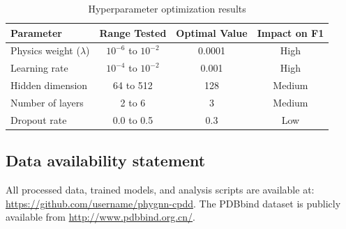 \begin{table}[H]
\centering
\caption{Hyperparameter optimization results}
\begin{tabular}{lccc}
\toprule
\textbf{Parameter} & \textbf{Range Tested} & \textbf{Optimal Value} & \textbf{Impact on F1} \\
\midrule
Physics weight ($\lambda$) & $10^{-6}$ to $10^{-2}$ & 0.0001 & High \\
Learning rate & $10^{-4}$ to $10^{-2}$ & 0.001 & High \\
Hidden dimension & 64 to 512 & 128 & Medium \\
Number of layers & 2 to 6 & 3 & Medium \\
Dropout rate & 0.0 to 0.5 & 0.3 & Low \\
\bottomrule
\end{tabular}
\end{table}

\subsection*{Data availability statement}
All processed data, trained models, and analysis scripts are available at: \url{https://github.com/username/phygnn-cpdd}. The PDBbind dataset is publicly available from \url{http://www.pdbbind.org.cn/}.
